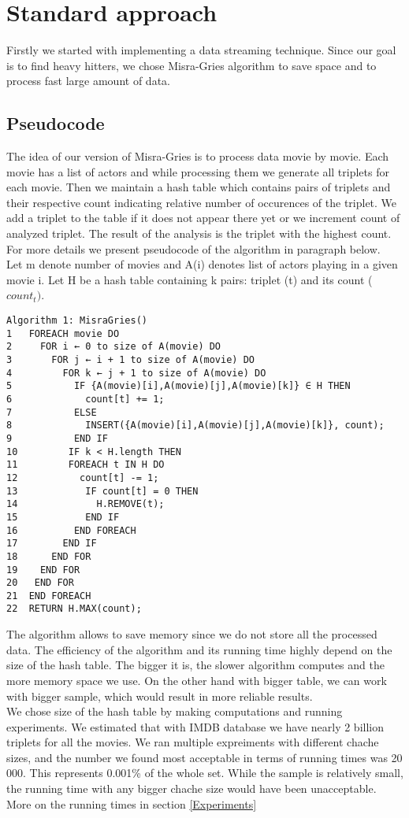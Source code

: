 \label{Standard}
\section{Standard approach}

Firstly we started with implementing a data streaming technique. Since our goal is to find heavy hitters, we chose Misra-Gries algorithm to save space and to process fast large amount of data.

\label{MisraGries}
\subsection{Pseudocode}
The idea of our version of Misra-Gries is to process data movie by movie. Each movie has a list of actors and while processing them we generate all triplets for each movie. Then we maintain a hash table which contains pairs of triplets and their respective count indicating relative number of occurences of the triplet. We add a triplet to the table if it does not appear there yet or we increment count of analyzed triplet. The result of the analysis is the triplet with the highest count. For more details we present pseudocode of the algorithm in paragraph below.
\\
Let m denote number of movies and A(i) denotes list of actors playing in a given movie i. 
Let H be a hash table containing k pairs: triplet (t) and its count (\(count_t)\).
\begin{verbatim}
Algorithm 1: MisraGries()
1	FOREACH movie DO
2	  FOR i ← 0 to size of A(movie) DO
3	    FOR j ← i + 1 to size of A(movie) DO
4	      FOR k ← j + 1 to size of A(movie) DO
5	        IF {A(movie)[i],A(movie)[j],A(movie)[k]} ∈ H THEN
6	          count[t] += 1;
7	        ELSE
8	          INSERT({A(movie)[i],A(movie)[j],A(movie)[k]}, count);  
9	        END IF
10	       IF k < H.length THEN
11	       FOREACH t IN H DO
12	         count[t] -= 1;
13	          IF count[t] = 0 THEN
14	            H.REMOVE(t);
15	          END IF
16	        END FOREACH
17	      END IF      
18	    END FOR
19	  END FOR
20	 END FOR
21	END FOREACH
22	RETURN H.MAX(count);	  	                    	  
\end{verbatim}

The algorithm allows to save memory since we do not store all the processed data. The efficiency of the algorithm and its running time highly depend on the size of the hash table. The bigger it is, the slower algorithm computes and the more memory space we use. On the other hand with bigger table, we can work with bigger sample, which would result in more reliable results.
\\
We chose size of the hash table by making computations and running experiments. We estimated that with IMDB database we have nearly 2 billion triplets for all the movies. We ran multiple expreiments with different chache sizes, and the number we found most acceptable in terms of running times was 20 000. This represents 0.001\% of the whole set. While the sample is relatively small, the running time with any bigger chache size would have been unacceptable. More on the running times in section \ref{Experiments}
\\
\label{AnalysisMisraGries}
